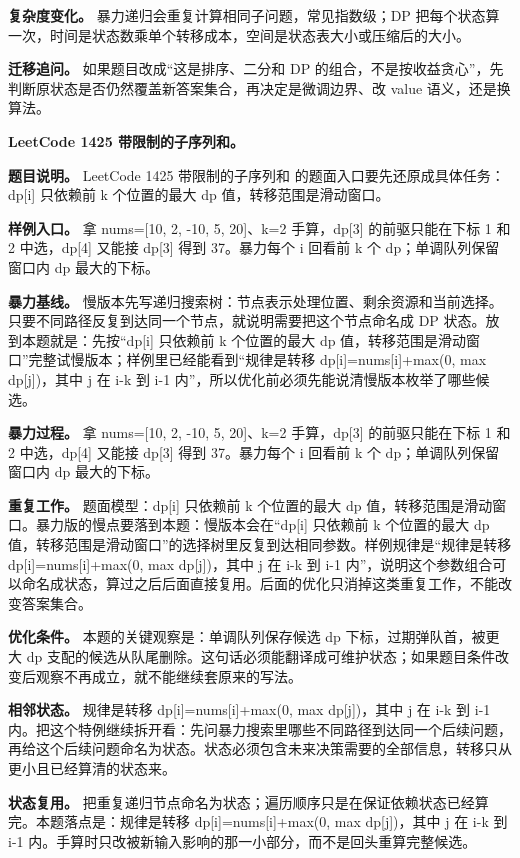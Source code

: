 \textbf{复杂度变化。} 暴力递归会重复计算相同子问题，常见指数级；DP 把每个状态算一次，时间是状态数乘单个转移成本，空间是状态表大小或压缩后的大小。

\textbf{迁移追问。} 如果题目改成“这是排序、二分和 DP 的组合，不是按收益贪心”，先判断原状态是否仍然覆盖新答案集合，再决定是微调边界、改 value 语义，还是换算法。

\noindent\textbf{LeetCode 1425 带限制的子序列和。}

\textbf{题目说明。} LeetCode 1425 带限制的子序列和 的题面入口要先还原成具体任务：dp[i] 只依赖前 k 个位置的最大 dp 值，转移范围是滑动窗口。

\textbf{样例入口。} 拿 nums=[10, 2, -10, 5, 20]、k=2 手算，dp[3] 的前驱只能在下标 1 和 2 中选，dp[4] 又能接 dp[3] 得到 37。暴力每个 i 回看前 k 个 dp；单调队列保留窗口内 dp 最大的下标。

\textbf{暴力基线。} 慢版本先写递归搜索树：节点表示处理位置、剩余资源和当前选择。只要不同路径反复到达同一个节点，就说明需要把这个节点命名成 DP 状态。放到本题就是：先按“dp[i] 只依赖前 k 个位置的最大 dp 值，转移范围是滑动窗口”完整试慢版本；样例里已经能看到“规律是转移 dp[i]=nums[i]+max(0, max dp[j])，其中 j 在 i-k 到 i-1 内”，所以优化前必须先能说清慢版本枚举了哪些候选。

\textbf{暴力过程。} 拿 nums=[10, 2, -10, 5, 20]、k=2 手算，dp[3] 的前驱只能在下标 1 和 2 中选，dp[4] 又能接 dp[3] 得到 37。暴力每个 i 回看前 k 个 dp；单调队列保留窗口内 dp 最大的下标。

\textbf{重复工作。} 题面模型：dp[i] 只依赖前 k 个位置的最大 dp 值，转移范围是滑动窗口。暴力版的慢点要落到本题：慢版本会在“dp[i] 只依赖前 k 个位置的最大 dp 值，转移范围是滑动窗口”的选择树里反复到达相同参数。样例规律是“规律是转移 dp[i]=nums[i]+max(0, max dp[j])，其中 j 在 i-k 到 i-1 内”，说明这个参数组合可以命名成状态，算过之后后面直接复用。后面的优化只消掉这类重复工作，不能改变答案集合。

\textbf{优化条件。} 本题的关键观察是：单调队列保存候选 dp 下标，过期弹队首，被更大 dp 支配的候选从队尾删除。这句话必须能翻译成可维护状态；如果题目条件改变后观察不再成立，就不能继续套原来的写法。

\textbf{相邻状态。} 规律是转移 dp[i]=nums[i]+max(0, max dp[j])，其中 j 在 i-k 到 i-1 内。把这个特例继续拆开看：先问暴力搜索里哪些不同路径到达同一个后续问题，再给这个后续问题命名为状态。状态必须包含未来决策需要的全部信息，转移只从更小且已经算清的状态来。

\textbf{状态复用。} 把重复递归节点命名为状态；遍历顺序只是在保证依赖状态已经算完。本题落点是：规律是转移 dp[i]=nums[i]+max(0, max dp[j])，其中 j 在 i-k 到 i-1 内。手算时只改被新输入影响的那一小部分，而不是回头重算完整候选。

